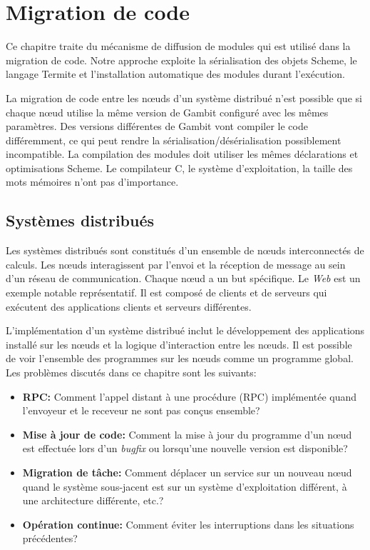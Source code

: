 \chapter{Migration de code}
\label{ch:task_migration}

Ce chapitre traite du mécanisme de diffusion de modules qui est utilisé dans
la migration de code. Notre approche exploite la sérialisation des objets
Scheme, le langage Termite et l'installation automatique des modules durant
l'exécution.

La migration de code entre les nœuds d'un système distribué n'est possible
que si chaque nœud utilise la même version de Gambit configuré avec les
mêmes paramètres. Des versions différentes de Gambit vont compiler le code
différemment, ce qui peut rendre la sérialisation/désérialisation possiblement
incompatible. La compilation des modules doit utiliser les mêmes déclarations
et optimisations Scheme. Le compilateur C, le système d'exploitation, la taille
des mots mémoires n'ont pas d'importance.

\section{Systèmes distribués}

Les systèmes distribués sont constitués d'un ensemble de nœuds interconnectés
de calculs. Les nœuds interagissent par l'envoi et la réception de message au
sein d'un réseau de communication. Chaque nœud a un but spécifique. Le
\textit{Web} est un exemple notable représentatif.  Il est composé de clients
et de serveurs qui exécutent des applications clients et serveurs différentes.

L'implémentation d'un système distribué inclut le développement des applications
installé sur les nœuds et la logique d'interaction entre les nœuds. Il est
possible de voir l'ensemble des programmes sur les nœuds comme un programme
global. Les problèmes discutés dans ce chapitre sont les suivants:

\begin{itemize}

  \item {\bf RPC:} Comment l'appel distant à une procédure (RPC)
    implémentée quand l'envoyeur et le receveur ne sont pas conçus
    ensemble?

  \item {\bf Mise à jour de code:} Comment la mise à jour du programme d'un
    nœud est effectuée lors d'un \textit{bugfix} ou lorsqu'une nouvelle
    version est disponible?

  \item {\bf Migration de tâche:} Comment déplacer un service sur un nouveau
    nœud quand le système sous-jacent est sur un système d'exploitation
    différent, à une architecture différente, etc.?

  \item {\bf Opération continue:} Comment éviter les interruptions dans les
    situations précédentes?

\end{itemize}

